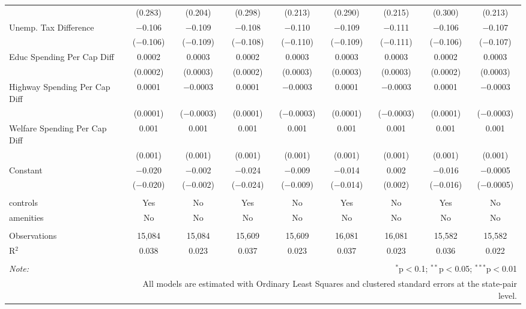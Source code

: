 \begin{table}[!htbp]
\begin{tabular}{@{\extracolsep{5pt}}lcccccccc}
  & (0.283) & (0.204) & (0.298) & (0.213) & (0.290) & (0.215) & (0.300) & (0.213) \\ 
  Unemp. Tax Difference & $-$0.106 & $-$0.109 & $-$0.108 & $-$0.110 & $-$0.109 & $-$0.111 & $-$0.106 & $-$0.107 \\ 
  & ($-$0.106) & ($-$0.109) & ($-$0.108) & ($-$0.110) & ($-$0.109) & ($-$0.111) & ($-$0.106) & ($-$0.107) \\ 
  Educ Spending Per Cap Diff & 0.0002 & 0.0003 & 0.0002 & 0.0003 & 0.0003 & 0.0003 & 0.0002 & 0.0003 \\ 
  & (0.0002) & (0.0003) & (0.0002) & (0.0003) & (0.0003) & (0.0003) & (0.0002) & (0.0003) \\ 
  Highway Spending Per Cap Diff & 0.0001 & $-$0.0003 & 0.0001 & $-$0.0003 & 0.0001 & $-$0.0003 & 0.0001 & $-$0.0003 \\ 
  & (0.0001) & ($-$0.0003) & (0.0001) & ($-$0.0003) & (0.0001) & ($-$0.0003) & (0.0001) & ($-$0.0003) \\ 
  Welfare Spending Per Cap Diff & 0.001 & 0.001 & 0.001 & 0.001 & 0.001 & 0.001 & 0.001 & 0.001 \\ 
  & (0.001) & (0.001) & (0.001) & (0.001) & (0.001) & (0.001) & (0.001) & (0.001) \\ 
  Constant & $-$0.020 & $-$0.002 & $-$0.024 & $-$0.009 & $-$0.014 & 0.002 & $-$0.016 & $-$0.0005 \\ 
  & ($-$0.020) & ($-$0.002) & ($-$0.024) & ($-$0.009) & ($-$0.014) & (0.002) & ($-$0.016) & ($-$0.0005) \\ 
 \hline \\[-1.8ex] 
controls & Yes & No & Yes & No & Yes & No & Yes & No \\ 
amenities & No & No & No & No & No & No & No & No \\ 
\hline \\[-1.8ex] 
Observations & 15,084 & 15,084 & 15,609 & 15,609 & 16,081 & 16,081 & 15,582 & 15,582 \\ 
R$^{2}$ & 0.038 & 0.023 & 0.037 & 0.023 & 0.037 & 0.023 & 0.036 & 0.022 \\ 
\hline 
\hline \\[-1.8ex] 
\textit{Note:}  & \multicolumn{8}{r}{$^{*}$p$<$0.1; $^{**}$p$<$0.05; $^{***}$p$<$0.01} \\ 
 & \multicolumn{8}{r}{All models are estimated with Ordinary Least Squares and clustered standard errors at the state-pair level.} \\ 
\end{tabular} 
\end{table} 
